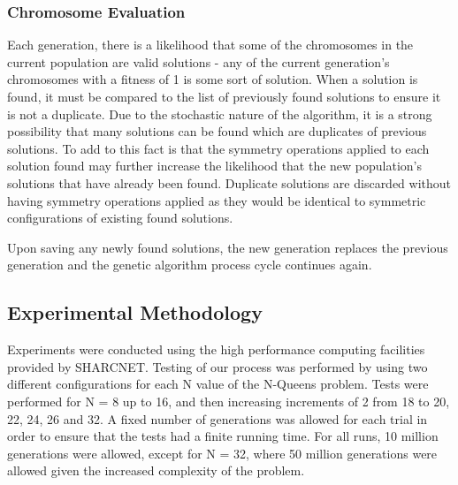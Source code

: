 \documentclass{sig-alternate}
\begin{document}
\newpage
\subsubsection{Chromosome Evaluation}
Each generation, there is a likelihood that some of the chromosomes in the current population are valid solutions - any of the current generation's chromosomes with a fitness of 1 is some sort of solution. When a solution is found, it must be compared to the list of previously found solutions to ensure it is not a duplicate. Due to the stochastic nature of the algorithm, it is a strong possibility that many solutions can be found which are duplicates of previous solutions. To add to this fact is that the symmetry operations applied to each solution found may further increase the likelihood that the new population's solutions that have already been found. Duplicate solutions are discarded without having symmetry operations applied as they would be identical to symmetric configurations of existing found solutions.

Upon saving any newly found solutions, the new generation replaces the previous generation and the genetic algorithm process cycle continues again.

\subsection{Experimental Methodology}
Experiments were conducted using the high performance computing facilities provided by SHARCNET. Testing of our process was performed by using two different configurations for each N value of the N-Queens problem. Tests were performed for N = 8 up to 16, and then increasing increments of 2 from 18 to 20, 22, 24, 26 and 32. A fixed number of generations was allowed for each trial in order to ensure that the tests had a finite running time. For all runs, 10 million generations were allowed, except for N = 32, where 50 million generations were allowed given the increased complexity of the problem.
\end{document}
